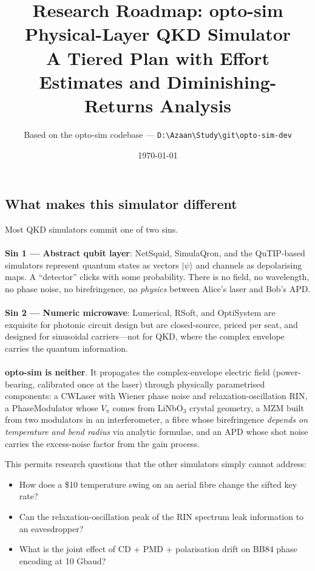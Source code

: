 \documentclass[11pt,a4paper]{article}
\title{\textbf{Research Roadmap: opto-sim Physical-Layer QKD Simulator}\\[6pt]
\large A Tiered Plan with Effort Estimates and Diminishing-Returns Analysis}
\author{Based on the opto-sim codebase --- \texttt{D:\textbackslash Azaan\textbackslash Study\textbackslash git\textbackslash opto-sim-dev}}
\date{\today}
\begin{document}
\maketitle

\subsection*{What makes this simulator different}
Most QKD simulators commit one of two sins.\\
\\
\textbf{Sin 1 --- Abstract qubit layer}: NetSquid, SimulaQron, and the QuTIP-based simulators represent quantum states as vectors
$|\psi\rangle$ and channels as depolarising maps.  A ``detector'' clicks with some probability.  There is no field, no wavelength,
no phase noise, no birefringence, no \emph{physics} between Alice's laser and Bob's APD.\\
\\
\textbf{Sin 2 --- Numeric microwave}: Lumerical, RSoft, and OptiSystem are exquisite for photonic circuit design but are
closed-source, priced per seat, and designed for sinusoidal carriers---not for QKD, where the complex envelope carries the
quantum information.\\
\\
\textbf{opto-sim is neither}.  It propagates the complex-envelope electric field (power-bearing, calibrated once at the laser)
through physically parametrised components: a CWLaser with Wiener phase noise and relaxation-oscillation RIN, a PhaseModulator
whose $V_\pi$ comes from LiNbO$_3$ crystal geometry, a MZM built from two modulators in an interferometer, a fibre whose
birefringence \emph{depends on temperature and bend radius} via analytic formulae, and an APD whose shot noise carries the
excess-noise factor from the gain process.

\vspace{6pt}
\noindent This permits research questions that the other simulators simply cannot address:
\begin{itemize}[nosep]
    \item How does a \$10 temperature swing on an aerial fibre change the sifted key rate?
    \item Can the relaxation-oscillation peak of the RIN spectrum leak information to an eavesdropper?
    \item What is the joint effect of CD + PMD + polarisation drift on BB84 phase encoding at 10 Gbaud?
\end{itemize}
\end{document}
